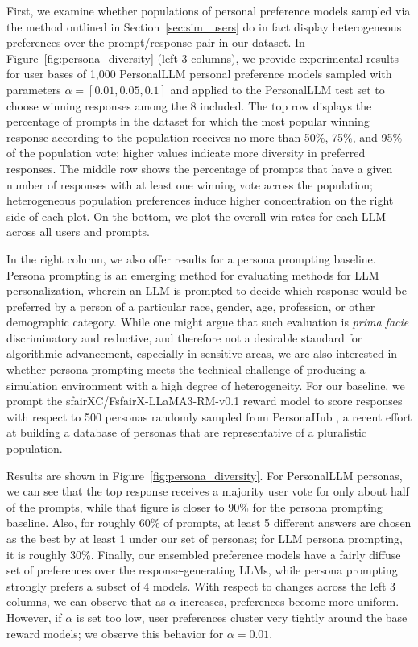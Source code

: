 First, we examine whether populations of personal preference models sampled via the method outlined in Section~\ref{sec:sim_users} do in fact display heterogeneous preferences over the prompt/response pair in our dataset.
In Figure~\ref{fig:persona_diversity} (left 3 columns), we provide experimental results for user bases of 1,000 \textsf{PersonalLLM} personal preference models sampled with parameters $\alpha=[0.01, 0.05, 0.1]$ and applied to the \textsf{PersonalLLM} test set to choose winning responses among the 8 included.
The top row displays the percentage of prompts in the dataset for which the most popular winning response according to the population receives no more than 50\%, 75\%, and 95\% of the population vote; higher values indicate more diversity in preferred responses.  
The middle row shows the percentage of prompts that have a given number of responses with at least one winning vote across the population; heterogeneous population preferences induce higher concentration on the right side of each plot.
On the bottom, we plot the overall win rates for each LLM across all users and prompts.

In the right column, we also offer results for a persona prompting baseline.  
Persona prompting \citep{castricato2024personareproducibletestbedpluralistic, chan2024scalingsyntheticdatacreation, jang2023personalizedsoupspersonalizedlarge} is an emerging method for evaluating methods for LLM personalization, wherein an LLM is prompted to decide which response would be preferred by a person of a particular race, gender, age, profession, or other demographic category.  
While one might argue that such evaluation is \textit{prima facie} discriminatory and reductive, and therefore not a desirable standard for algorithmic advancement, especially in sensitive areas, we are also interested in whether persona prompting meets the technical challenge of producing a simulation environment with a high degree of heterogeneity.
For our baseline, we prompt the sfairXC/FsfairX-LLaMA3-RM-v0.1 reward model \citep{dong2023raft} to score responses with respect to 500 personas randomly sampled from PersonaHub \citet{chan2024scalingsyntheticdatacreation}, a recent effort at building a database of personas that are representative of a pluralistic population.

Results are shown in Figure~\ref{fig:persona_diversity}.
For \textsf{PersonalLLM} personas, we can see that the top response receives a majority user vote for only about half of the prompts, while that figure is closer to 90\% for the persona prompting baseline.  
Also, for roughly 60\% of prompts, at least 5 different answers are chosen as the best by at least 1 under our set of personas; for LLM persona prompting, it is roughly 30\%.  
Finally, our ensembled preference models have a fairly diffuse set of preferences over the response-generating LLMs, while persona prompting strongly prefers a subset of 4 models.
With respect to changes across the left 3 columns, we can observe that as $\alpha$ increases, preferences become more uniform.  
However, if $\alpha$ is set too low, user preferences cluster very tightly around the base reward models; we observe this behavior for $\alpha=0.01$.

